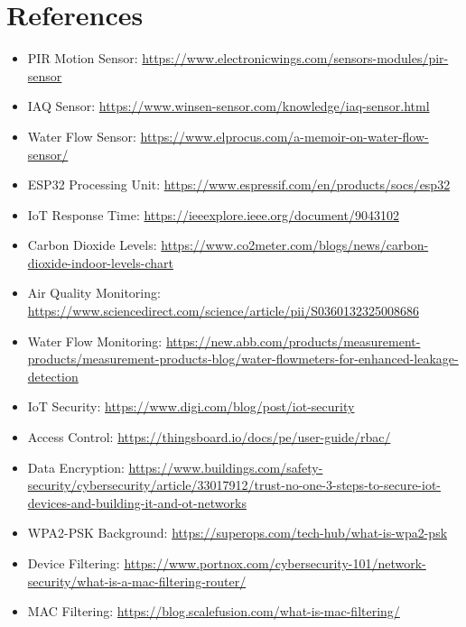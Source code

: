 \section*{References}

\raggedright
\begin{itemize}
  \item PIR Motion Sensor: \url{https://www.electronicwings.com/sensors-modules/pir-sensor}
  \item IAQ Sensor: \url{https://www.winsen-sensor.com/knowledge/iaq-sensor.html}
  \item Water Flow Sensor: \url{https://www.elprocus.com/a-memoir-on-water-flow-sensor/}
  \item ESP32 Processing Unit: \url{https://www.espressif.com/en/products/socs/esp32}
  \item IoT Response Time: \url{https://ieeexplore.ieee.org/document/9043102}
  \item Carbon Dioxide Levels: \url{https://www.co2meter.com/blogs/news/carbon-dioxide-indoor-levels-chart}
  \item Air Quality Monitoring: \url{https://www.sciencedirect.com/science/article/pii/S0360132325008686}
  \item Water Flow Monitoring: \url{https://new.abb.com/products/measurement-products/measurement-products-blog/water-flowmeters-for-enhanced-leakage-detection}
  \item IoT Security: \url{https://www.digi.com/blog/post/iot-security}
  \item Access Control: \url{https://thingsboard.io/docs/pe/user-guide/rbac/}
  \item Data Encryption: \url{https://www.buildings.com/safety-security/cybersecurity/article/33017912/trust-no-one-3-steps-to-secure-iot-devices-and-building-it-and-ot-networks}
  \item WPA2-PSK Background: \url{https://superops.com/tech-hub/what-is-wpa2-psk}
  \item Device Filtering: \url{https://www.portnox.com/cybersecurity-101/network-security/what-is-a-mac-filtering-router/}
  \item MAC Filtering: \url{https://blog.scalefusion.com/what-is-mac-filtering/}
\end{itemize}